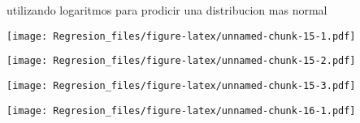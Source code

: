 \documentclass[]{article}
\newenvironment{Shaded}{\begin{snugshade}}{\end{snugshade}}
\newcommand{\KeywordTok}[1]{\textcolor[rgb]{0.13,0.29,0.53}{\textbf{#1}}}
\newcommand{\NormalTok}[1]{#1}
\newcommand{\OperatorTok}[1]{\textcolor[rgb]{0.81,0.36,0.00}{\textbf{#1}}}
\begin{document}
utilizando logaritmos para prodicir una distribucion mas normal

\begin{Shaded}
\end{Shaded}

\texttt{[image: Regresion\_files/figure-latex/unnamed-chunk-15-1.pdf]}

\begin{Shaded}
\end{Shaded}

\texttt{[image: Regresion\_files/figure-latex/unnamed-chunk-15-2.pdf]}

\begin{Shaded}
\end{Shaded}

\texttt{[image: Regresion\_files/figure-latex/unnamed-chunk-15-3.pdf]}

\begin{Shaded}
\end{Shaded}

\texttt{[image: Regresion\_files/figure-latex/unnamed-chunk-16-1.pdf]}

\begin{Shaded}
\end{Shaded}
\end{document}
